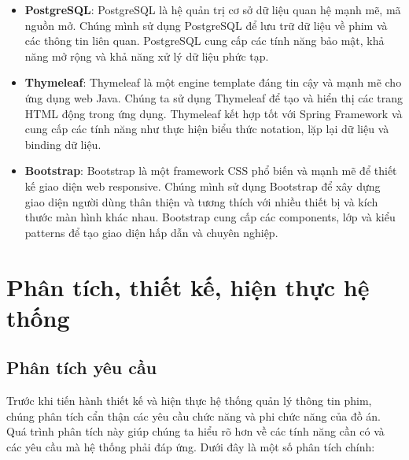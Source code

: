 \documentclass[12pt]{article}
\begin{document}
\begin{itemize}
    \item \textbf{PostgreSQL}: PostgreSQL là hệ quản trị cơ sở dữ liệu quan hệ mạnh mẽ, mã nguồn mở. Chúng mình sử dụng PostgreSQL để lưu trữ dữ liệu về phim và các thông tin liên quan. PostgreSQL cung cấp các tính năng bảo mật, khả năng mở rộng và khả năng xử lý dữ liệu phức tạp.
    \item \textbf{Thymeleaf}: Thymeleaf là một engine template đáng tin cậy và mạnh mẽ cho ứng dụng web Java. Chúng ta sử dụng Thymeleaf để tạo và hiển thị các trang HTML động trong ứng dụng. Thymeleaf kết hợp tốt với Spring Framework và cung cấp các tính năng như thực hiện biểu thức notation, lặp lại dữ liệu và binding dữ liệu.
    \item \textbf{Bootstrap}: Bootstrap là một framework CSS phổ biến và mạnh mẽ để thiết kế giao diện web responsive. Chúng mình sử dụng Bootstrap để xây dựng giao diện người dùng thân thiện và tương thích với nhiều thiết bị và kích thước màn hình khác nhau. Bootstrap cung cấp các components, lớp và kiểu patterns để tạo giao diện hấp dẫn và chuyên nghiệp.
\end{itemize}
\section{Phân tích, thiết kế, hiện thực hệ thống}
\subsection{Phân tích yêu cầu}
Trước khi tiến hành thiết kế và hiện thực hệ thống quản lý thông tin phim, chúng phân tích cẩn thận các yêu cầu chức năng và phi chức năng của đồ án. Quá trình phân tích này giúp chúng ta hiểu rõ hơn về các tính năng cần có và các yêu cầu mà hệ thống phải đáp ứng. Dưới đây là một số phân tích chính:
\end{document}
